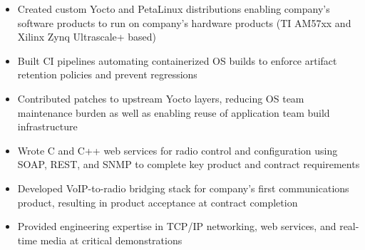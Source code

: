 \begin{itemize}
    \item Created custom Yocto and PetaLinux distributions enabling company's software products to run on company's hardware products (TI AM57xx and Xilinx Zynq Ultrascale+ based)
    \item Built CI pipelines automating containerized OS builds to enforce artifact retention policies and prevent regressions
    \item Contributed patches to upstream Yocto layers, reducing OS team maintenance burden as well as enabling reuse of application team build infrastructure
    \item Wrote C and C++ web services for radio control and configuration using SOAP, REST, and SNMP to complete key product and contract requirements
    \item Developed VoIP-to-radio bridging stack for company's first communications product, resulting in product acceptance at contract completion
    \item Provided engineering expertise in TCP/IP networking, web services, and real-time media at critical demonstrations
\end{itemize}
